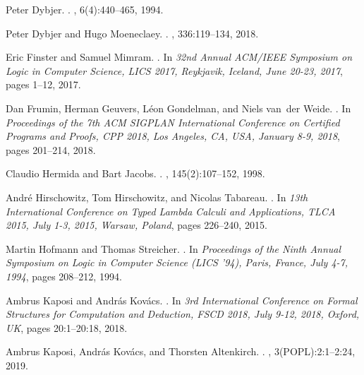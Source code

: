 \documentclass[9pt]{entcs}
\newcommand{\0}{\textbf{0}} %
\begin{document}
\begin{thebibliography}{10}
	Peter Dybjer.
	.
	, 6(4):440--465, 1994.
	
	Peter Dybjer and Hugo Moeneclaey.
	.
	, 336:119--134, 2018.
	
	Eric Finster and Samuel Mimram.
	.
	\newblock In {\em 32nd Annual {ACM/IEEE} Symposium on Logic in Computer
		Science, {LICS} 2017, Reykjavik, Iceland, June 20-23, 2017}, pages 1--12,
	2017.
	
	Dan Frumin, Herman Geuvers, L{\'{e}}on Gondelman, and Niels van~der Weide.
	.
	\newblock In {\em Proceedings of the 7th {ACM} {SIGPLAN} International
		Conference on Certified Programs and Proofs, {CPP} 2018, Los Angeles, CA,
		USA, January 8-9, 2018}, pages 201--214, 2018.
	
	Claudio Hermida and Bart Jacobs.
	.
	, 145(2):107--152, 1998.
	
	Andr{\'{e}} Hirschowitz, Tom Hirschowitz, and Nicolas Tabareau.
	.
	\newblock In {\em 13th International Conference on Typed Lambda Calculi and
		Applications, {TLCA} 2015, July 1-3, 2015, Warsaw, Poland}, pages 226--240,
	2015.
	
	Martin Hofmann and Thomas Streicher.
	.
	\newblock In {\em Proceedings of the Ninth Annual Symposium on Logic in
		Computer Science {(LICS} '94), Paris, France, July 4-7, 1994}, pages
	208--212, 1994.
	
	Ambrus Kaposi and Andr{\'{a}}s Kov{\'{a}}cs.
	.
	\newblock In {\em 3rd International Conference on Formal Structures for
		Computation and Deduction, {FSCD} 2018, July 9-12, 2018, Oxford, {UK}}, pages
	20:1--20:18, 2018.
	
	Ambrus Kaposi, Andr{\'{a}}s Kov{\'{a}}cs, and Thorsten Altenkirch.
	.
	, 3({POPL}):2:1--2:24, 2019.
	

\end{thebibliography}
\end{document}
